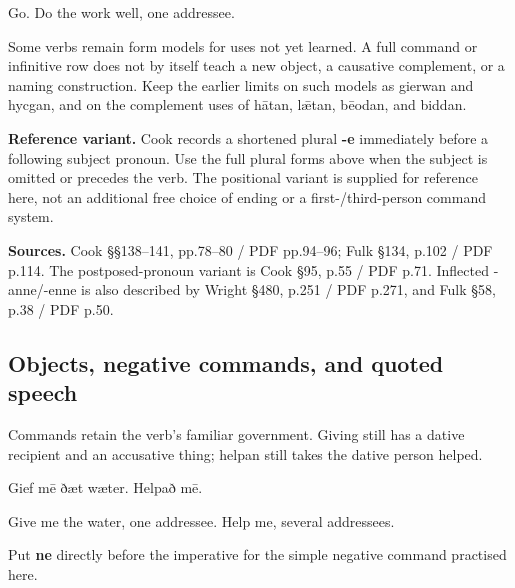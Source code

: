 Go. Do the work well, one addressee.

Some verbs remain form models for uses not yet learned. A full command or infinitive row does not by itself teach a new object, a causative complement, or a naming construction. Keep the earlier limits on such models as gierwan and hycgan, and on the complement uses of hātan, lǣtan, bēodan, and biddan.

\textbf{Reference variant.} Cook records a shortened plural \textbf{-e} immediately before a following subject pronoun. Use the full plural forms above when the subject is omitted or precedes the verb. The positional variant is supplied for reference here, not an additional free choice of ending or a first-/\allowbreak{}third-person command system.

\textbf{Sources.} Cook §§138–141, pp.78–80 /\allowbreak{} PDF pp.94–96; Fulk §134, p.102 /\allowbreak{} PDF p.114. The postposed-pronoun variant is Cook §95, p.55 /\allowbreak{} PDF p.71. Inflected -anne/\allowbreak{}-enne is also described by Wright §480, p.251 /\allowbreak{} PDF p.271, and Fulk §58, p.38 /\allowbreak{} PDF p.50.

\subsection*{Objects, negative commands, and quoted speech}

Commands retain the verb’s familiar government. Giving still has a dative recipient and an accusative thing; helpan still takes the dative person helped.

Gief mē ðæt wæter. Helpað mē.

Give me the water, one addressee. Help me, several addressees.

Put \textbf{ne} directly before the imperative for the simple negative command practised here.

